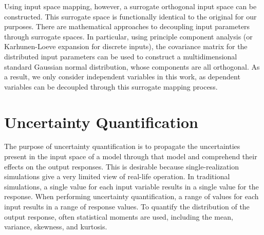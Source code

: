 Using input space mapping, however, a surrogate orthogonal input space can be
constructed.  This surrogate space is functionally identical to the original for our purposes.
There are mathematical approaches to decoupling input parameters through surrogate
spaces.  In particular, using principle component analysis (or Karhunen-Loeve expansion
\cite{karhunen} for discrete inputs), the covariance matrix for the distributed input parameters
can be used to construct a multidimensional
standard Gaussian normal distribution, whose components are all orthogonal.
As a result, we only consider independent variables in this work, as dependent variables can
be decoupled through this surrogate mapping process.


\section{Uncertainty Quantification}
The purpose of uncertainty quantification is to propagate the uncertainties present in the input space of a
model through that model and comprehend their effects on the output responses.  This is desirable because
single-realization simulations give a very limited view of real-life operation.  In traditional simulations, a
single value for each input variable results in a single value for the response.  When performing uncertainty
quantification, a range of values for each input results in a range of response values.  To quantify the
distribution of the output response, often statistical moments are used, including the mean, variance,
skewness, and kurtosis.

